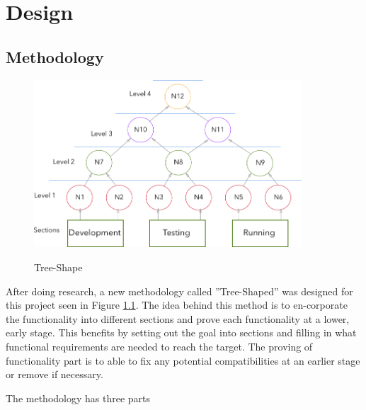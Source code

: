 \chapter{Design}

\section{Methodology}

\begin{figure}[!h]
    \caption{Tree-Shape}
    \centering
    \includegraphics[width=100mm]{images/methodology}
    \label{fig:tree-shape}
\end{figure}



After doing research, a new methodology called ”Tree-Shaped” was designed for this project seen in Figure \ref{fig:tree-shape}. The idea behind this method is to en-corporate the functionality into different sections and prove each functionality at a lower, early stage. This benefits by setting out the goal into sections and filling in what functional requirements are needed to reach the target. The proving of functionality part is to able to fix any potential compatibilities at an earlier stage or remove if necessary.

The methodology has three parts

